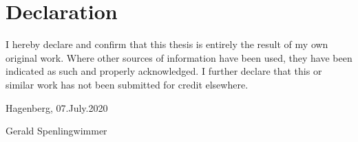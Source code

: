 
\chapter*{Declaration}
\noindent
I hereby declare and confirm that this thesis is entirely the result of my own original work. 
Where other sources of information have been used, they have been indicated as such and properly 
acknowledged. I further declare that this or similar work has not been submitted for credit elsewhere.
\par
\vspace{10mm}
\noindent
Hagenberg, 07.July.2020
\par
\vspace{12mm}
\noindent
Gerald Spenlingwimmer